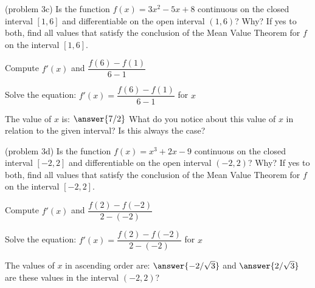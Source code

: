\documentclass[handout]{ximera}
\begin{document}
\begin{problem}(problem 3c)
  Is the function $f(x) = 3x^2 -5x + 8$ continuous on the closed interval $[1,6]$ and differentiable on the open interval $(1,6)$? Why?
  If yes to both, find all values that satisfy the conclusion of the Mean Value Theorem for $f$ on the interval $[1,6]$.
	
    \begin{hint}
      Compute $f'(x)$ and $\dfrac{f(6) - f(1)}{6-1}$
    \end{hint}
		\begin{hint}
		  Solve the equation: $f'(x) = \dfrac{f(6) - f(1)}{6-1}$ for $x$
		\end{hint}
		
		The value of $x$ is:
		 $\answer{7/2}$
     What do you notice about this value of $x$ in relation to the given interval? Is this always the case?
\end{problem}

\begin{problem}(problem 3d)
  Is the function $f(x) = x^3 + 2x -9$ continuous on the closed interval $[-2,2]$ and differentiable on the open interval $(-2,2)$? Why?
  If yes to both, find all values that satisfy the conclusion of the Mean Value Theorem for $f$ on the interval $[-2,2]$.
  	
    \begin{hint}
      Compute $f'(x)$ and $\dfrac{f(2) - f(-2)}{2-(-2)}$
    \end{hint}
		\begin{hint}
		  Solve the equation: $f'(x) = \dfrac{f(2) - f(-2)}{2-(-2)}$ for $x$
		\end{hint}
		
		The values of $x$ in ascending order are:
		 $\answer{-2/\sqrt 3}$ and $\answer{2/\sqrt 3}$
     are these values in the interval $(-2,2)$?
\end{problem}
\end{document}
